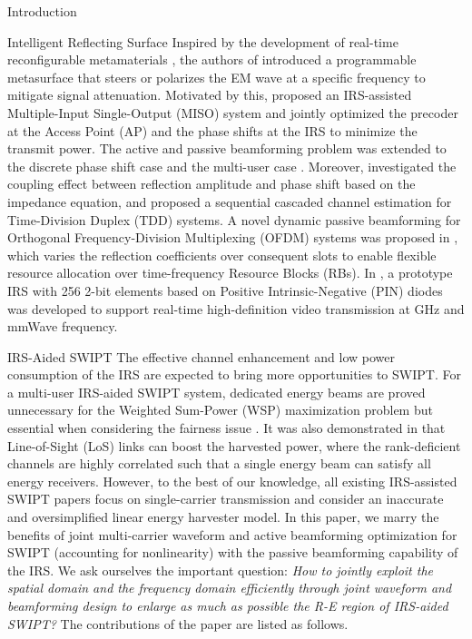 \documentclass[journal]{IEEEtran}
\begin{document}
\begin{section}{Introduction}
\begin{subsection}{Intelligent Reflecting Surface}
			Inspired by the development of real-time reconfigurable metamaterials \cite{Cui2014}, the authors of \cite{Liaskos2018} introduced a programmable metasurface that steers or polarizes the EM wave at a specific frequency to mitigate signal attenuation. Motivated by this, \cite{Wu2018} proposed an IRS-assisted Multiple-Input Single-Output (MISO) system and jointly optimized the precoder at the Access Point (AP) and the phase shifts at the IRS to minimize the transmit power. The active and passive beamforming problem was extended to the discrete phase shift case \cite{Wu2019a} and the multi-user case \cite{Wu2019}. Moreover, \cite{Abeywickrama2019} investigated the coupling effect between reflection amplitude and phase shift based on the impedance equation, and \cite{Nadeem2019} proposed a sequential cascaded channel estimation for Time-Division Duplex (TDD) systems.	A novel dynamic passive beamforming for Orthogonal Frequency-Division Multiplexing (OFDM) systems was proposed in \cite{Yang2020}, which varies the reflection coefficients over consequent slots to enable flexible resource allocation over time-frequency Resource Blocks (RBs). In \cite{Dai2020}, a prototype IRS with \num{256} \num{2}-bit elements based on Positive Intrinsic-Negative (PIN) diodes was developed to support real-time high-definition video transmission at \si{GHz} and mmWave frequency.
		\end{subsection}


		\begin{subsection}{IRS-Aided SWIPT}
			The effective channel enhancement and low power consumption of the IRS are expected to bring more opportunities to SWIPT. For a multi-user IRS-aided SWIPT system, dedicated energy beams are proved unnecessary for the Weighted Sum-Power (WSP) maximization problem \cite{Wu2020b} but essential when considering the fairness issue \cite{Tang2019}. It was also demonstrated in \cite{Wu2020a} that Line-of-Sight (LoS) links can boost the harvested power, where the rank-deficient channels are highly correlated such that a single energy beam can satisfy all energy receivers. However, to the best of our knowledge, all existing IRS-assisted SWIPT papers focus on single-carrier transmission and consider an inaccurate and oversimplified linear energy harvester model. In this paper, we marry the benefits of joint multi-carrier waveform and active beamforming optimization for SWIPT (accounting for nonlinearity) with the passive beamforming capability of the IRS. We ask ourselves the important question: \textit{How to jointly exploit the spatial domain and the frequency domain efficiently through joint waveform and beamforming design to enlarge as much as possible the R-E region of IRS-aided SWIPT?} The contributions of the paper are listed as follows.


\end{subsection}
\end{section}
\end{document}
